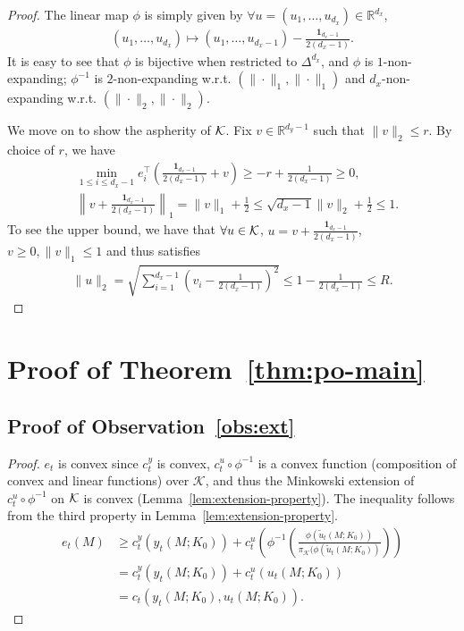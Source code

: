 \begin{proof}
The linear map $\phi$ is simply given by $\forall u=(u_1,\dots,u_{d_x})\in\mathbb{R}^{d_x}$,
\begin{align}
\label{eq:transformation-map}
(u_1,\dots,u_{d_x})\mapsto (u_1,\dots,u_{d_x-1})-\frac{\mathbf{1}_{d_x-1}}{2(d_x-1)}.
\end{align}
It is easy to see that $\phi$ is bijective when restricted to $\Delta^{d_x}$, and $\phi$ is $1$-non-expanding; $\phi^{-1}$ is $2$-non-expanding w.r.t. $(\|\cdot\|_1, \|\cdot\|_1)$ and $d_x$-non-expanding w.r.t. $(\|\cdot\|_2, \|\cdot\|_2)$.

We move on to show the aspherity of $\mathcal{K}$. Fix $v\in\mathbb{R}^{d_y-1}$ such that $\|v\|_2\le r$. By choice of $r$, we have
\begin{align*}
&\min_{1\le i\le d_x-1}e_i^{\top}\left(\frac{\mathbf{1}_{d_x-1}}{2(d_x-1)}+v\right)\ge -r+\frac{1}{2(d_x-1)}\ge  0,\\
&\left\|v+\frac{\mathbf{1}_{d_x-1}}{2(d_x-1)}\right\|_1=\|v\|_1+\frac{1}{2}\le \sqrt{d_x-1}\|v\|_2+\frac{1}{2}\le 1.
\end{align*}
To see the upper bound, we have that $\forall u\in\mathcal{K}$, $u=v+\frac{\mathbf{1}_{d_x-1}}{2(d_x-1)}$, $v\ge 0, \|v\|_1\le 1$ and thus satisfies
\begin{align*}
\|u\|_2=\sqrt{\sum_{i=1}^{d_x-1}\left(v_i-\frac{1}{2(d_x-1)}\right)^2}\le 1-\frac{1}{2(d_x-1)}\le R. 
\end{align*}
\end{proof}

\newpage

\section{Proof of Theorem~\ref{thm:po-main}}

\subsection{Proof of Observation~\ref{obs:ext}}
\begin{proof}
$e_t$ is convex since $c_t^y$ is convex, $c_t^u\circ\phi^{-1}$ is a convex function (composition of convex and linear functions) over $\mathcal{K}$, and thus the Minkowski extension of $c_t^u\circ\phi^{-1}$ on $\mathcal{K}$ is convex (Lemma~\ref{lem:extension-property}). The inequality follows from the third property in Lemma~\ref{lem:extension-property}.
\begin{align*}
e_t(M)&\ge c_t^y(y_t(M; K_0))+c_t^u(\phi^{-1}(\frac{\phi(\tilde{u}_t(M;K_0))}{\pi_{\mathcal{K}}(\phi(\tilde{u}_t(M;K_0))}))\\
&=c_t^y(y_t(M; K_0))+c_t^u(u_t(M; K_0))\\
&=c_t(y_t(M;K_0),u_t(M;K_0)).
\end{align*}
\end{proof}

